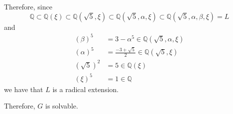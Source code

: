 \documentclass[12pt]{AlgebraQual}
\begin{document}
\begin{solution}
\begin{enumerate}[label=(\alph*)]
    Therefore, since $$\mathbb{Q}\subset\mathbb{Q}(\xi)\subset\mathbb{Q}(\sqrt{5},\xi)\subset \mathbb{Q}(\sqrt{5},\alpha,\xi)\subset\mathbb{Q}(\sqrt{5},\alpha,\beta,\xi)=L$$ and \begin{align*}
        (\beta)^5&=3-\alpha^5\in\mathbb{Q}(\sqrt{5},\alpha,\xi)\\
        (\alpha)^5&=\frac{-3+\sqrt{5}}{2}\in\mathbb{Q}(\sqrt{5},\xi)\\
        (\sqrt{5})^2&=5\in\mathbb{Q}(\xi)\\
        (\xi)^5&=1\in\mathbb{Q}
    \end{align*} we have that $L$ is a radical extension.

    Therefore, $G$ is solvable.
\end{enumerate}
\end{solution}
\newpage
\end{document}
